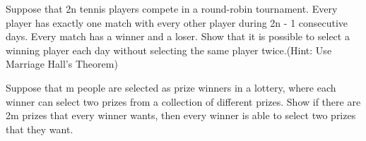 \documentclass{exam}
\begin{document}
\begin{questions}


\question
Suppose that 2n tennis players compete in a round-robin
tournament. Every player has exactly one match with every other player during 2n - 1
consecutive days. Every
match has a winner and a loser. Show that it is possible
to select a winning player each day without selecting the
same player twice.(Hint: Use Marriage Hall's Theorem)
\newpage

\question
Suppose that m people are selected as prize winners in a
lottery, where each winner can select two prizes from a
collection of different prizes. Show if there are 2m prizes
that every winner wants, then every winner is able to
select two prizes that they want.
\newpage




\end{questions}
\end{document}
